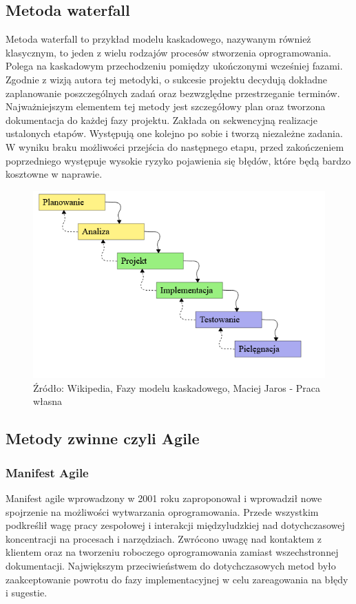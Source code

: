 \documentclass[oneside,polski,logo]{amuthesis}
\begin{document}
\subsection {Metoda waterfall}
Metoda waterfall to przykład modelu kaskadowego, nazywanym również klasycznym, to jeden z wielu rodzajów procesów stworzenia oprogramowania. Polega na kaskadowym przechodzeniu pomiędzy ukończonymi wcześniej fazami. Zgodnie z wizją autora tej metodyki, o sukcesie projektu decydują dokładne zaplanowanie poszczególnych zadań oraz bezwzględne przestrzeganie terminów. Najważniejszym elementem tej metody jest szczegółowy plan oraz tworzona dokumentacja do każdej fazy projektu. Zakłada on sekwencyjną realizacje ustalonych etapów. Występują one kolejno po sobie i tworzą niezależne zadania. W wyniku braku możliwości przejścia do następnego etapu, przed zakończeniem poprzedniego występuje wysokie ryzyko pojawienia się błędów, które będą bardzo kosztowne w naprawie.\cite{waterfall}\\


\begin{figure}[h]
	\centering
	\includegraphics[width=15cm]{images/hyps/waterfall.png}
	\caption{Źródło: Wikipedia, Fazy modelu kaskadowego, Maciej Jaros - Praca własna}
\end{figure}

\subsection{Metody zwinne czyli Agile}

\subsubsection{Manifest Agile}
Manifest agile wprowadzony w 2001 roku zaproponował i wprowadził nowe spojrzenie na możliwości wytwarzania oprogramowania. Przede wszystkim podkreślił wagę pracy zespołowej i interakcji międzyludzkiej nad dotychczasowej koncentracji na procesach i narzędziach. Zwrócono uwagę nad kontaktem z klientem oraz na tworzeniu roboczego oprogramowania zamiast wszechstronnej dokumentacji. Największym przeciwieństwem do dotychczasowych metod było zaakceptowanie powrotu do fazy implementacyjnej w celu zareagowania na błędy i sugestie.\cite{agile}\cite{agile2}\\ \\
\end{document}
